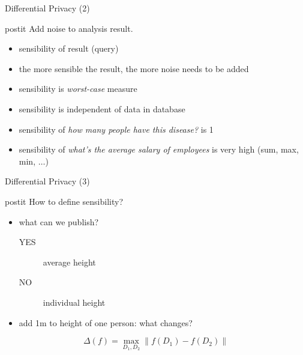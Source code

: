 \documentclass{beamer}
\begin{document}
\begin{frame}{Differential Privacy (2)}
  \begin{beamercolorbox}[wd=\textwidth,rounded=true,shadow=true]{postit}
    Add noise to analysis result.
  \end{beamercolorbox}
  \pause
  \begin{itemize}
    \item sensibility of result (query)
    \item the more sensible the result, the more noise needs to be added
    \item sensibility is \textit{worst-case} measure
    \item sensibility is independent of data in database
    \item sensibility of \textit{how many people have this disease?} is 1
    \item sensibility of \textit{what's the average salary of employees} is
      very high (sum, max, min, $\ldots$)
  \end{itemize}
\end{frame}

\begin{frame}{Differential Privacy (3)}
  \begin{beamercolorbox}[wd=\textwidth,rounded=true,shadow=true]{postit}
    How to define sensibility?
  \end{beamercolorbox}
  \pause
  \begin{itemize}
    \item what can we publish?
      \pause
      \begin{description}
        \item[YES] average height
        \item[NO] individual height
      \end{description}
      \pause
    \item add 1m to height of one person: what changes?
  \end{itemize}
  \pause
  \begin{equation*}
    \Delta(f) = \max_{D_1, D_2} \| f(D_1) - f(D_2) \|
  \end{equation*}
\end{frame}
\end{document}
